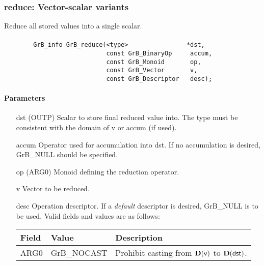 \subsubsection{{\sf reduce}: Vector-scalar variants}

Reduce all stored values into a single scalar.





\paragraph{\syntax}

\begin{verbatim}
        GrB_info GrB_reduce(<type>                *dst,
                            const GrB_BinaryOp     accum,
                            const GrB_Monoid       op,
                            const GrB_Vector       v,
                            const GrB_Descriptor   desc);
\end{verbatim}


\paragraph{Parameters}

\begin{itemize}[leftmargin=1.1in]
    \item[{\sf dst}]    ({\sf OUTP}) Scalar to store final reduced value into.  The type must be
                        consistent with the domain of {\sf v} or {\sf accum} (if used).

    \item[{\sf accum}]  Operator used for accumulation into {\sf dst}.  If no accumulation
                        is desired, {\sf GrB\_NULL} should be specified.

    \item[{\sf op}]     ({\sf ARG0}) Monoid defining the reduction operator.
    \item[{\sf v}]    Vector to be reduced.

    \item[{\sf desc}]   Operation descriptor. If a
    \emph{default} descriptor is desired, {\sf GrB\_NULL} is to be
    used.  Valid fields and values are as follows: \\
    \begin{tabular}{lll}
    Field  & Value & Description \\
    \hline
    {\sf ARG0} & {\sf GrB\_NOCAST} & Prohibit casting from $\bold{D}({\sf v})$ to 
    $\bold{D}({\sf dst})$.  \\
    \end{tabular}\\
\end{itemize}

